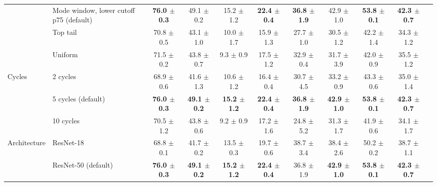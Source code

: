 \begin{table}[t]
\begin{adjustbox}{max width=\textwidth}
\begin{tabular}{l l c c c c c c c c c}
\rowcolor{blue!10}  & Mode window, lower cutoff p75 (default) & \textbf{76.0 {\scriptsize$\pm$ 0.3}} & 49.1 {\scriptsize$\pm$ 0.2} & 15.2 {\scriptsize$\pm$ 1.2} & \textbf{22.4 {\scriptsize$\pm$ 0.4}} & \textbf{36.8 {\scriptsize$\pm$ 1.9}} & 42.9 {\scriptsize$\pm$ 1.0} & \textbf{53.8 {\scriptsize$\pm$ 0.1}} & \textbf{42.3 {\scriptsize$\pm$ 0.7}} \\
 & Top tail & 70.8 {\scriptsize$\pm$ 0.5} & 43.1 {\scriptsize$\pm$ 1.0} & 10.0 {\scriptsize$\pm$ 1.7} & 15.9 {\scriptsize$\pm$ 1.3} & 27.7 {\scriptsize$\pm$ 1.0} & 30.5 {\scriptsize$\pm$ 1.2} & 42.2 {\scriptsize$\pm$ 1.4} & 34.3 {\scriptsize$\pm$ 1.2} \\
 & Uniform & 71.5 {\scriptsize$\pm$ 0.2} & 43.8 {\scriptsize$\pm$ 0.7} & 9.3 {\scriptsize$\pm$ 0.9} & 17.5 {\scriptsize$\pm$ 1.2} & 32.9 {\scriptsize$\pm$ 0.4} & 31.7 {\scriptsize$\pm$ 3.9} & 42.0 {\scriptsize$\pm$ 0.9} & 35.5 {\scriptsize$\pm$ 1.2} \\
\midrule
Cycles & 2 cycles & 68.9 {\scriptsize$\pm$ 0.6} & 41.6 {\scriptsize$\pm$ 1.3} & 10.6 {\scriptsize$\pm$ 1.2} & 16.4 {\scriptsize$\pm$ 0.4} & 30.7 {\scriptsize$\pm$ 4.5} & 33.2 {\scriptsize$\pm$ 0.9} & 43.3 {\scriptsize$\pm$ 0.6} & 35.0 {\scriptsize$\pm$ 1.4} \\
\rowcolor{blue!10}  & 5 cycles (default) & \textbf{76.0 {\scriptsize$\pm$ 0.3}} & \textbf{49.1 {\scriptsize$\pm$ 0.2}} & \textbf{15.2 {\scriptsize$\pm$ 1.2}} & \textbf{22.4 {\scriptsize$\pm$ 0.4}} & \textbf{36.8 {\scriptsize$\pm$ 1.9}} & \textbf{42.9 {\scriptsize$\pm$ 1.0}} & \textbf{53.8 {\scriptsize$\pm$ 0.1}} & \textbf{42.3 {\scriptsize$\pm$ 0.7}} \\
 & 10 cycles & 70.5 {\scriptsize$\pm$ 1.2} & 43.8 {\scriptsize$\pm$ 0.6} & 9.2 {\scriptsize$\pm$ 0.9} & 17.2 {\scriptsize$\pm$ 1.6} & 24.8 {\scriptsize$\pm$ 5.2} & 31.3 {\scriptsize$\pm$ 1.7} & 41.9 {\scriptsize$\pm$ 0.6} & 34.1 {\scriptsize$\pm$ 1.7} \\
\midrule
Architecture & ResNet-18 & 68.8 {\scriptsize$\pm$ 0.1} & 41.7 {\scriptsize$\pm$ 0.2} & 13.5 {\scriptsize$\pm$ 0.3} & 19.7 {\scriptsize$\pm$ 0.6} & 38.7 {\scriptsize$\pm$ 3.4} & 38.4 {\scriptsize$\pm$ 2.6} & 50.2 {\scriptsize$\pm$ 0.2} & 38.7 {\scriptsize$\pm$ 1.1} \\
\rowcolor{blue!10}  & ResNet-50 (default) & \textbf{76.0 {\scriptsize$\pm$ 0.3}} & \textbf{49.1 {\scriptsize$\pm$ 0.2}} & \textbf{15.2 {\scriptsize$\pm$ 1.2}} & \textbf{22.4 {\scriptsize$\pm$ 0.4}} & 36.8 {\scriptsize$\pm$ 1.9} & \textbf{42.9 {\scriptsize$\pm$ 1.0}} & \textbf{53.8 {\scriptsize$\pm$ 0.1}} & \textbf{42.3 {\scriptsize$\pm$ 0.7}} \\

\end{tabular}
\end{adjustbox}
\end{table}

